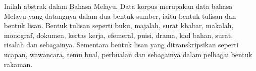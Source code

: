 \begin{msAbstract}
Inilah abstrak dalam Bahasa Melayu. Data korpus merupakan data bahasa
Melayu yang datangnya dalam dua bentuk sumber, iaitu bentuk tulisan
dan bentuk lisan. Bentuk tulisan seperti buku, majalah, surat khabar,
makalah, monograf, dokumen, kertas kerja, efemeral, puisi, drama,
kad bahan, surat, risalah dan sebagainya. Sementara bentuk lisan yang
ditranskripsikan seperti ucapan, wawancara, temu bual, perbualan dan
sebagainya dalam pelbagai bentuk rakaman.
\end{msAbstract}